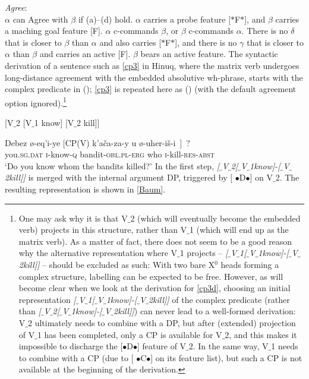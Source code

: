 \documentclass[output=paper
,modfonts
,nonflat]{langsci/langscibook}
\begin{document}
\ea\label{ex:mueller:29} {\itshape Agree}:\\
$\alpha$ can Agree with $\beta$ if (a)--(d) hold.
\ea $\alpha$ carries a probe feature [$*$F$*$], and $\beta$ carries a
maching goal feature [F].
\ex $\alpha$ \label{agua2}c-commands $\beta$, or $\beta$ c-commands $\alpha$.
\ex There is \label{agua3}no $\delta$ that is closer to $\beta$ than $\alpha$ and
also carries [$*$F$*$], and there is no $\gamma$ that is closer to
$\alpha$ than $\beta$ and carries an active [F].
\ex $\beta$ bears an \label{agua4}active feature. 
\z
\z
The syntactic derivation of a sentence such as \ref{cp3} in Hinuq,
where the matrix verb undergoes long-distance agreement with the
embedded absolutive wh-phrase, starts with the complex predicate in
(\Next); \ref{cp3} is repeated here as (\NNext) (with the default
agreement option ignored).\footnote{\label{vari2}One may ask why it is
  that V$\_$2 (which will eventually become the embedded verb) projects
  in this structure, rather than V$\_$1 (which will end up as the matrix
  verb).  As a matter of fact, there does not seem to be a good reason
  why the alternative representation where V$\_$1 projects -- {\it
    [$\_${V$\_$1}[$\_${V$\_$1}know]-[$\_${V$\_$2}kill]]} -- should be excluded as such:
  With two bare X$^0$ heads forming a complex structure, labelling can
  be expected to be free. However, as will become clear when we look
  at the derivation for \ref{cp3d}, choosing an initial representation
  {\itshape [$\_${V$\_$1}[$\_${V$\_$1}know]-[$\_${V$\_$2}kill]]} of the complex predicate
  (rather than {\itshape [$\_${V$\_$2}[$\_${V$\_$1}know]-[$\_${V$\_$2}kill]]}) can never lead
  to a well-formed derivation: V$\_$2 ultimately needs to combine with a
  DP, but after (extended) projection of V$\_$1 has been completed, only
  a CP is available for V$\_$2, and this makes it impossible to discharge
  the [{\small $\bullet$}D{\small $\bullet$}] feature of V$\_$2. In the
  same way, V$\_$1 needs to combine with a CP (due to [{\small
      $\bullet$}C{\small $\bullet$}] on its feature list), but such a
  CP is not available at the beginning of the derivation.}

\ea\relax\label{ex:mueller:30} [V$\_$2 [V$\_$1 know] [V$\_$2 kill]]\z

 \ea\label{ex:mueller:31}  \label{cp3d}
 \gll  Debez \o -eq'i-ye [CP(V) k'a\v{c}a\textgamma -za-y \textbeltl u \o -uher-i\v{s}-\textbeltl i~]~? \\
  you.{\scshape sg.dat} {\scshape i}-know-{\scshape q} {} bandit-{\scshape obl.pl-erg}   who {\scshape i}-kill-{\scshape res-abst} \\ 
 \glt `Do you know whom the bandits killed?'
\z
In the first step, {\itshape [$\_${V$\_$2}[$\_${V$\_$1}know]-[$\_${V$\_$2}kill]]} is merged
with  the internal argument DP, triggered by  [{\small
    $\bullet$}D{\small $\bullet$}] on V$\_$2. The resulting
representation is shown in \ref{Baum}.
\end{document}
